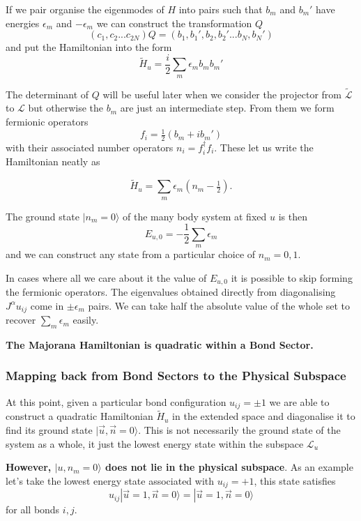 If we pair organise the eigenmodes of \(H\) into pairs such that \(b_m\) and \(b_m'\) have energies \(\epsilon_m\) and \(-\epsilon_m\) we can construct the transformation \(Q\) \[(c_1, c_2... c_{2N}) Q = (b_1, b_1', b_2, b_2' ... b_{N}, b_{N}')\] and put the Hamiltonian into the form \[\tilde{H}_u = \frac{i}{2} \sum_m \epsilon_m b_m b_m'\]

The determinant of \(Q\) will be useful later when we consider the projector from \(\mathcal{\tilde{L}}\) to \(\mathcal{L}\) but otherwise the \(b_m\) are just an intermediate step. From them we form fermionic operators \[ f_i = \tfrac{1}{2} (b_m + ib_m')\] with their associated number operators \(n_i = f^\dagger_i f_i\). These let us write the Hamiltonian neatly as

\[ \tilde{H}_u = \sum_m \epsilon_m (n_m - \tfrac{1}{2}).\]

The ground state \(|n_m = 0\rangle\) of the many body system at fixed \(u\) is then \[E_{u,0} = -\frac{1}{2}\sum_m \epsilon_m \] and we can construct any state from a particular choice of \(n_m = 0,1\).

In cases where all we care about it the value of \(E_{u,0}\) it is possible to skip forming the fermionic operators. The eigenvalues obtained directly from diagonalising \(J^{\alpha} u_{ij}\) come in \(\pm \epsilon_m\) pairs. We can take half the absolute value of the whole set to recover \(\sum_m \epsilon_m\) easily.

\textbf{The Majorana Hamiltonian is quadratic within a Bond Sector.}

\hypertarget{mapping-back-from-bond-sectors-to-the-physical-subspace}{%
\subsubsection{Mapping back from Bond Sectors to the Physical Subspace}\label{mapping-back-from-bond-sectors-to-the-physical-subspace}}

At this point, given a particular bond configuration \(u_{ij} = \pm 1\) we are able to construct a quadratic Hamiltonian \(\tilde{H}_u\) in the extended space and diagonalise it to find its ground state \(|\vec{u}, \vec{n} = 0\rangle\). This is not necessarily the ground state of the system as a whole, it just the lowest energy state within the subspace \(\mathcal{L}_u\)

\textbf{However, \(|u, n_m = 0\rangle\) does not lie in the physical subspace}. As an example let's take the lowest energy state associated with \(u_{ij} = +1\), this state satisfies \[u_{ij} |\vec{u}=1, \vec{n} = 0\rangle = |\vec{u}=1, \vec{n} = 0\rangle\] for all bonds \(i,j\).

